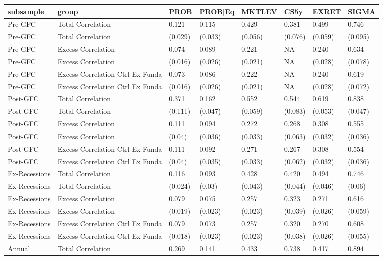 
\begin{tabular}{l|l|l|l|l|l|l|l}
\hline
subsample & group & PROB & PROB|Eq & MKTLEV & CS5y & EXRET & SIGMA\\
\hline
Pre-GFC & Total Correlation & 0.121 & 0.115 & 0.429 & 0.381 & 0.499 & 0.746\\
Pre-GFC & Total Correlation & (0.029) & (0.033) & (0.056) & (0.076) & (0.059) & (0.095)\\
Pre-GFC & Excess Correlation & 0.074 & 0.089 & 0.221 & NA & 0.240 & 0.634\\
Pre-GFC & Excess Correlation & (0.016) & (0.026) & (0.021) & NA & (0.028) & (0.078)\\
Pre-GFC & Excess Correlation Ctrl Ex Funda & 0.073 & 0.086 & 0.222 & NA & 0.240 & 0.619\\
Pre-GFC & Excess Correlation Ctrl Ex Funda & (0.016) & (0.026) & (0.021) & NA & (0.028) & (0.072)\\
Post-GFC & Total Correlation & 0.371 & 0.162 & 0.552 & 0.544 & 0.619 & 0.838\\
Post-GFC & Total Correlation & (0.111) & (0.047) & (0.059) & (0.083) & (0.053) & (0.047)\\
Post-GFC & Excess Correlation & 0.111 & 0.094 & 0.272 & 0.268 & 0.308 & 0.555\\
Post-GFC & Excess Correlation & (0.04) & (0.036) & (0.033) & (0.063) & (0.032) & (0.036)\\
Post-GFC & Excess Correlation Ctrl Ex Funda & 0.111 & 0.092 & 0.271 & 0.267 & 0.308 & 0.554\\
Post-GFC & Excess Correlation Ctrl Ex Funda & (0.04) & (0.035) & (0.033) & (0.062) & (0.032) & (0.036)\\
Ex-Recessions & Total Correlation & 0.116 & 0.093 & 0.428 & 0.420 & 0.494 & 0.746\\
Ex-Recessions & Total Correlation & (0.024) & (0.03) & (0.043) & (0.044) & (0.046) & (0.06)\\
Ex-Recessions & Excess Correlation & 0.079 & 0.075 & 0.257 & 0.323 & 0.271 & 0.616\\
Ex-Recessions & Excess Correlation & (0.019) & (0.023) & (0.023) & (0.039) & (0.026) & (0.059)\\
Ex-Recessions & Excess Correlation Ctrl Ex Funda & 0.079 & 0.073 & 0.257 & 0.320 & 0.270 & 0.608\\
Ex-Recessions & Excess Correlation Ctrl Ex Funda & (0.018) & (0.023) & (0.023) & (0.038) & (0.026) & (0.055)\\
Annual & Total Correlation & 0.269 & 0.141 & 0.433 & 0.738 & 0.417 & 0.894\\

\end{tabular}
